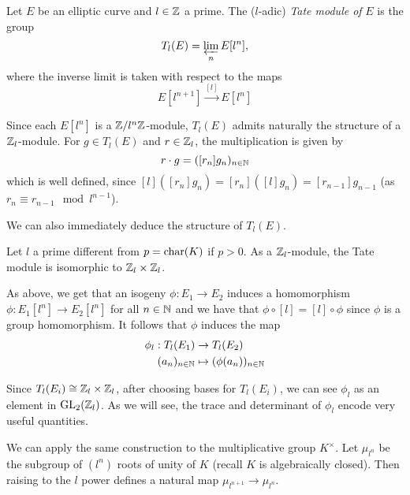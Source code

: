 
\begin{definition}
	Let $E$ be an elliptic curve and $l \in \mathbb{Z}$ a prime.
	The ($l$-adic) \emph{Tate module of} $E$ is the group
	\begin{equation*}
		T_l(E) = \varprojlim_n E[l^n],
	\end{equation*}
	where the inverse limit is taken with respect to the maps
	\begin{equation*}
		E[l^{n+1}]\xrightarrow{[l]} E[l^n]
	\end{equation*}
\end{definition}

Since each $E[l^n]$ is a $\mathbb{Z}/l^n\mathbb{Z}$-module, $T_l(E)$ admits naturally the
structure of a $\mathbb{Z}_l$-module. For $g \in T_l(E)$ and $r \in \mathbb{Z}_l$, the 
multiplication is given by
\begin{equation*}
	r \cdot g = ([r_n]g_n)_{n \in \mathbb{N}}
\end{equation*}
which is well defined, since $[l]([r_n]g_n) = [r_n]([l]g_n) = [r_{n-1}]g_{n-1}$
(as $r_n \equiv r_{n-1} \mod l^{n-1}$).

We can also immediately deduce the structure of $T_l(E)$.


\begin{proposition}
	Let $l$ a prime different from $p = \operatorname{char}(K)$ if $p > 0$.
	As a $\mathbb{Z}_l$-module, the Tate module is isomorphic to $\mathbb{Z}_l \times \mathbb{Z}_l$.
\end{proposition}

As above, we get that an isogeny $\phi: E_1 \to E_2$ induces a homomorphism
$\phi: E_1[l^n] \to E_2[l^n]$ for all $n \in \mathbb{N}$ and we have that
$\phi\circ[l] = [l]\circ\phi$ since $\phi$ is a group homomorphism.
It follows that $\phi$ induces the map
\begin{align*}
	\phi_l: T_l(E_1) &\to T_l(E_2)\\
	(a_n)_{n \in \mathbb{N}} &\mapsto (\phi(a_n))_{n \in \mathbb{N}}
\end{align*}

Since $T_l(E_i) \cong \mathbb{Z}_l\times \mathbb{Z}_l$, after choosing bases for
$T_l(E_i)$, we can see $\phi_l$ as an element in
$\operatorname{GL}_2(\mathbb{Z}_l)$.
As we will see, the trace and determinant of $\phi_l$ encode
very useful quantities. 

We can apply the same construction to the multiplicative group $K^\times$.
Let $\mu_{l^n}$ be the subgroup of $(l^n)$ roots of unity of $K$
(recall $K$ is algebraically closed). Then raising to the $l$
power defines a natural map $\mu_{l^{n+1}} \to \mu_{l^n}$.

